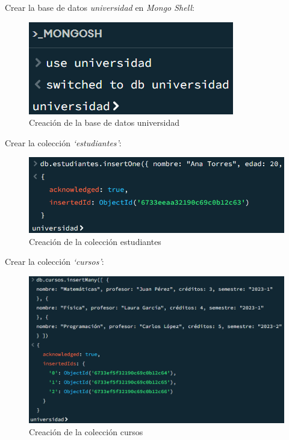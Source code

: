 Crear la base de datos \emph{universidad} en \textit{Mongo Shell}:

\begin{figure}[H]
  \centering
  \includegraphics{Imagenes/parte1/1.1.png}
  \caption{Creación de la base de datos universidad}
\end{figure}

Crear la colección \emph{`estudiantes'}:

\begin{figure}[H]
  \centering
  \includegraphics[scale = 0.8]{Imagenes/parte1/1.2.png}
  \caption{Creación de la colección estudiantes}
\end{figure}

Crear la colección \emph{`cursos'}:

\begin{figure}[H]
  \centering
  \includegraphics[scale = 0.5]{Imagenes/parte1/1.3.png}
  \caption{Creación de la colección cursos}
\end{figure}